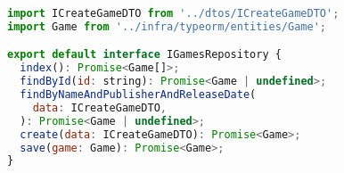 \begin{lstlisting}[language=JavaScript, caption={IGamesRepository},captionpos=b, label=alg:igamerepository]
import ICreateGameDTO from '../dtos/ICreateGameDTO';
import Game from '../infra/typeorm/entities/Game';

export default interface IGamesRepository {
  index(): Promise<Game[]>;
  findById(id: string): Promise<Game | undefined>;
  findByNameAndPublisherAndReleaseDate(
    data: ICreateGameDTO,
  ): Promise<Game | undefined>;
  create(data: ICreateGameDTO): Promise<Game>;
  save(game: Game): Promise<Game>;
}
  
\end{lstlisting}
